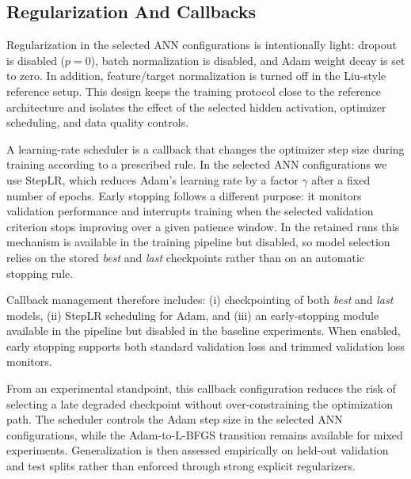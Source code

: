 \subsection{Regularization And Callbacks}
Regularization in the selected ANN configurations is intentionally light: dropout is disabled ($p=0$), batch normalization is disabled, and Adam weight decay is set to zero. In addition, feature/target normalization is turned off in the Liu-style reference setup. This design keeps the training protocol close to the reference architecture and isolates the effect of the selected hidden activation, optimizer scheduling, and data quality controls.

A learning-rate scheduler is a callback that changes the optimizer step size during training according to a prescribed rule. In the selected ANN configurations we use StepLR, which reduces Adam's learning rate by a factor \(\gamma\) after a fixed number of epochs. Early stopping follows a different purpose: it monitors validation performance and interrupts training when the selected validation criterion stops improving over a given patience window. In the retained runs this mechanism is available in the training pipeline but disabled, so model selection relies on the stored \textit{best} and \textit{last} checkpoints rather than on an automatic stopping rule.

Callback management therefore includes: (i) checkpointing of both \textit{best} and \textit{last} models, (ii) StepLR scheduling for Adam, and (iii) an early-stopping module available in the pipeline but disabled in the baseline experiments. When enabled, early stopping supports both standard validation loss and trimmed validation loss monitors.

From an experimental standpoint, this callback configuration reduces the risk of selecting a late degraded checkpoint without over-constraining the optimization path. The scheduler controls the Adam step size in the selected ANN configurations, while the Adam-to-L-BFGS transition remains available for mixed experiments. Generalization is then assessed empirically on held-out validation and test splits rather than enforced through strong explicit regularizers.

